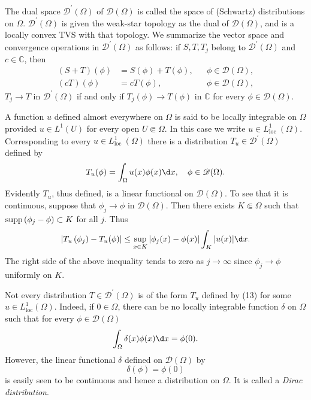\begin{para}
  The dual space $\mathscr{D}^{\prime}(\Omega)$ of $\mathscr{D}(\Omega)$ is called the space of 
  (Schwartz) distributions on $\Omega$. $\mathscr{D}^{\prime}(\Omega)$ is given the weak-star 
  topology as the dual of $\mathscr{D}(\Omega)$, and is a locally convex TVS with that topology. 
  We summarize the vector space and convergence operations in $\mathscr{D}^{\prime}(\Omega)$ as 
  follows: if $S, T, T_j$ belong to $\mathscr{D}^{\prime}(\Omega)$ and $c \in \mathbb{C}$, then
  \[
  \begin{aligned}
  (S+T)(\phi) & =S(\phi)+T(\phi), & & \phi \in \mathscr{D}(\Omega), \\
  (c T)(\phi) & =c T(\phi), & & \phi \in \mathscr{D}(\Omega),
  \end{aligned}
  \]
  $T_j \rightarrow T$ in $\mathscr{D}^{\prime}(\Omega)$ if and only if $T_j(\phi) \rightarrow T(\phi)$ in $\mathbb{C}$ for every $\phi \in \mathscr{D}(\Omega)$.
\end{para}


\begin{para}
  A function $u$ defined almost everywhere on $\Omega$ is said to be locally integrable on $\Omega$ provided $u \in L^1(U)$ for every open $U \Subset \Omega$. In this case we write $u \in L_{\text {loc }}^1(\Omega)$. Corresponding to every $u \in L_{\text {loc }}^1(\Omega)$ there is a distribution $T_u \in \mathscr{D}^{\prime}(\Omega)$ defined by
  \begin{equation}
    T_u(\phi)=\int_{\Omega} u(x) \phi(x) \d x, \quad \phi \in \mathscr{D}(\Omega).
  \end{equation}
  Evidently $T_u$, thus defined, is a linear functional on $\mathscr{D}(\Omega)$. To see that it is continuous, suppose that $\phi_j \rightarrow \phi$ in $\mathscr{D}(\Omega)$. Then there exists $K \Subset \Omega$ such that $\operatorname{supp}\left(\phi_j-\phi\right) \subset K$ for all $j$. Thus
  \[
  \left|T_u\left(\phi_j\right)-T_u(\phi)\right| \leq \sup _{x \in K}\left|\phi_j(x)-\phi(x)\right| \int_K|u(x)| \d x .
  \]
  The right side of the above inequality tends to zero as $j \rightarrow \infty$ since $\phi_j \rightarrow \phi$ uniformly on $K$.
\end{para}

\begin{para}
  Not every distribution $T \in \mathscr{D}^{\prime}(\Omega)$ is of the form $T_u$ defined by (13) for some $u \in L_{\mathrm{loc}}^1(\Omega)$. Indeed, if $0 \in \Omega$, there can be no locally integrable function $\delta$ on $\Omega$ such that for every $\phi \in \mathscr{D}(\Omega)$
  \[
  \int_{\Omega} \delta(x) \phi(x) \d x=\phi(0) .
  \]
  However, the linear functional $\delta$ defined on $\mathscr{D}(\Omega)$ by
  \begin{equation}
    \delta(\phi)=\phi(0)
  \end{equation}
  is easily seen to be continuous and hence a distribution on $\Omega$.
  It is called a \emph{Dirac distribution}.
\end{para}

